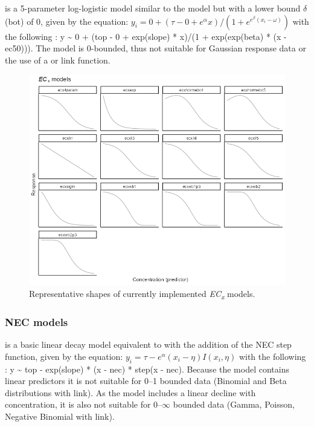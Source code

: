 \documentclass[
  shortnames]{jss}
\begin{document}
 is a 5-parameter log-logistic model similar to the  model but with a lower bound \(\delta\) (bot) of 0, given by the equation:
\(y_i = 0 + (\tau - 0 + e^{\alpha} x)/ (1 + e^{e^{\beta} (x_i - \omega)})\)
with the following : y \textasciitilde{} 0 + (top - 0 + exp(slope) * x)/(1 + exp(exp(beta) * (x - ec50))). The model is 0-bounded, thus not suitable for Gaussian response data or the use of a  or  link function.

\begin{figure}[ht]
  \centering
  \includegraphics[width=1\textwidth]{../vignettes/vignette-fig-exmp2b-theoretical_ecx_curves.png}
  \caption{Representative shapes of currently implemented  \textit{EC\textsubscript{x}} models.}
  \label{fig1}
\end{figure}

\subsubsection[NEC models]{NEC models}\label{nec-models}

 is a basic linear decay model equivalent to  with the addition of the NEC step function, given by the equation:
\(y_i = \tau - e^{\alpha} \left(x_i - \eta \right) I(x_i, \eta)\)
with the following : y \textasciitilde{} top - exp(slope) * (x - nec) * step(x - nec). Because the model contains linear predictors it is not suitable for 0--1 bounded data (Binomial and Beta distributions with  link). As the model includes a linear decline with concentration, it is also not suitable for 0--\(\infty\) bounded data (Gamma, Poisson, Negative Binomial with  link).
\end{document}
